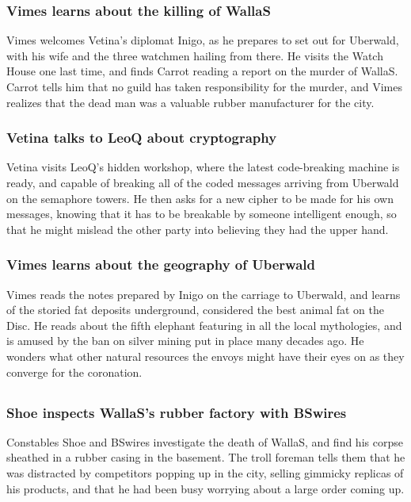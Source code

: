 \subsubsection{\Gls{Vimes} learns about the killing of \Gls{WallaS}}
\Gls{Vimes} welcomes \Gls{Vetina}'s diplomat \Gls{Inigo}, as he prepares to set out for Uberwald,
with his wife and the three watchmen hailing from there. He visits the Watch House one last time,
and finds \Gls{Carrot} reading a report on the murder of \Gls{WallaS}. \Gls{Carrot} tells him that
no guild has taken responsibility for the murder, and \Gls{Vimes} realizes that the dead man was a
valuable rubber manufacturer for the city.

\subsubsection{\Gls{Vetina} talks to \Gls{LeoQ} about cryptography}
\Gls{Vetina} visits \Gls{LeoQ}'s hidden workshop, where the latest code-breaking machine is ready,
and capable of breaking all of the coded messages arriving from Uberwald on the semaphore towers.
He then asks for a new cipher to be made for his own messages, knowing that it has to be breakable
by someone intelligent enough, so that he might mislead the other party into believing they had
the upper hand.

\subsubsection{\Gls{Vimes} learns about the geography of Uberwald}
\Gls{Vimes} reads the notes prepared by \Gls{Inigo} on the carriage to Uberwald, and learns of the
storied fat deposits underground, considered the best animal fat on the Disc. He reads about the
fifth elephant featuring in all the local mythologies, and is amused by the ban on silver mining
put in place many decades ago. He wonders what other natural resources the envoys might have their
eyes on as they converge for the coronation.

\subsection{}
\subsubsection{\Gls{Shoe} inspects \Gls{WallaS}'s rubber factory with \Gls{BSwires}}
Constables \Gls{Shoe} and \Gls{BSwires} investigate the death of \Gls{WallaS}, and find his corpse
sheathed in a rubber casing in the basement. The troll foreman tells them that he was distracted by
competitors popping up in the city, selling gimmicky replicas of his products, and that he had been
busy worrying about a large order coming up.


